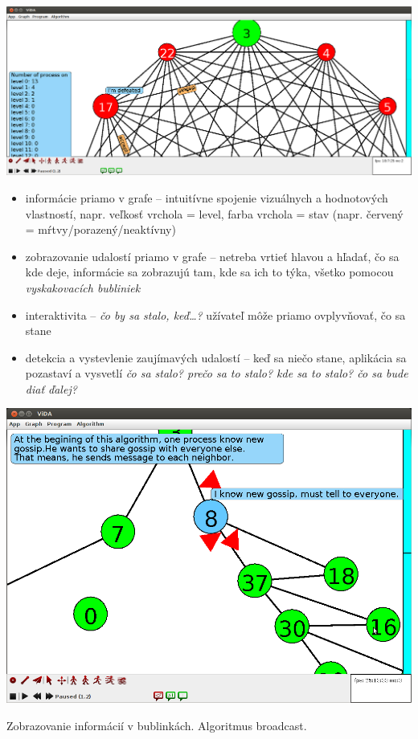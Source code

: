 \includegraphics[width=\columnwidth]{le}


\begin{itemize}

    \item informácie priamo v grafe -- intuitívne spojenie vizuálnych a hodnotových
    vlastností, napr. veľkosť vrchola = level, farba vrchola = stav (napr. červený =
    mŕtvy/porazený/neaktívny)
    \item zobrazovanie udalostí priamo v grafe -- netreba vrtieť hlavou a hľadať, čo sa kde deje,
    informácie sa zobrazujú tam, kde sa ich to týka, všetko pomocou \emph{vyskakovacích bubliniek}
    \item interaktivita -- \emph{čo by sa stalo, keď\dots?} užívateľ môže priamo ovplyvňovať, čo sa
    stane
    \item detekcia a vystevlenie zaujímavých udalostí -- keď sa niečo stane, aplikácia sa pozastaví a vysvetlí
    \emph{čo sa stalo? prečo sa to stalo? kde sa to stalo? čo sa bude diať ďalej?}

\end{itemize}


\includegraphics[width=\columnwidth]{bfs}
\caption{Zobrazovanie informácií v bublinkách. Algoritmus broadcast.}

